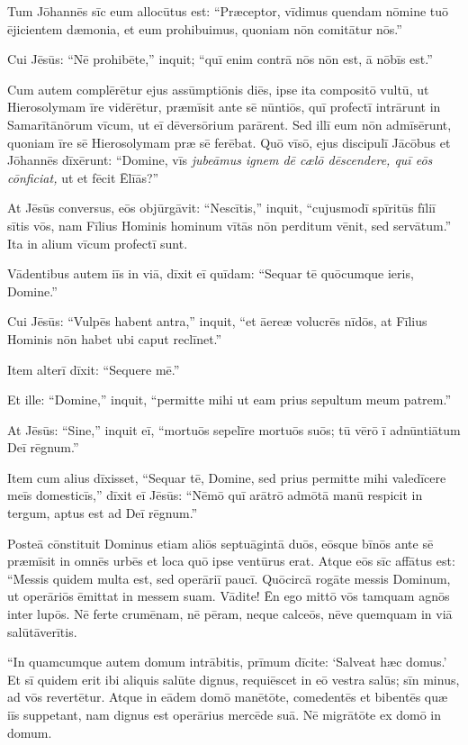\Versus Tum Jōhannēs sīc eum allocūtus est: ``Præceptor, vīdimus quendam nōmine tuō ējicientem dæmonia, et eum prohibuimus, quoniam nōn comitātur nōs.''

\Versus Cui Jēsūs: ``Nē prohibēte,'' inquit; ``quī enim contrā nōs nōn est, ā nōbīs est.''

\Versus Cum autem complērētur ejus assūmptiōnis diēs, ipse ita compositō vultū, ut Hierosolymam īre vidērētur,
\Versus præmīsit ante sē nūntiōs, quī profectī intrārunt in Samarītānōrum vīcum, ut eī dēversōrium parārent.
\Versus Sed illī eum nōn admīsērunt, quoniam īre sē Hierosolymam præ sē ferēbat.
\Versus Quō vīsō, ejus discipulī Jācōbus et Jōhannēs dīxērunt: ``Domine, vīs \emph{jubeāmus ignem dē cælō dēscendere, quī eōs cōnficiat,} ut et fēcit Ēlīās?''

\Versus At Jēsūs conversus, eōs objūrgāvit: ``Nescītis,'' inquit, ``cujusmodī spīritūs fīliī sītis vōs,
\Versus nam Fīlius Hominis hominum vītās nōn perditum vēnit, sed servātum.'' Ita in alium vīcum profectī sunt.

\Versus Vādentibus autem iīs in viā, dīxit eī quīdam: ``Sequar tē quōcumque ieris, Domine.''

\Versus Cui Jēsūs: ``Vulpēs habent antra,'' inquit, ``et āereæ volucrēs nīdōs, at Fīlius Hominis nōn habet ubi caput reclīnet.''

\Versus Item alterī dīxit: ``Sequere mē.''

Et ille: ``Domine,'' inquit, ``permitte mihi ut eam prius sepultum meum patrem.''

\Versus At Jēsūs: ``Sine,'' inquit eī, ``mortuōs sepelīre mortuōs suōs; tū vērō ī adnūntiātum Deī rēgnum.''

\Versus Item cum alius dīxisset, ``Sequar tē, Domine, sed prius permitte mihi valedīcere meīs domesticīs,''
\Versus dīxit eī Jēsūs: ``Nēmō quī arātrō admōtā manū respicit in tergum, aptus est ad Deī rēgnum.''


\Caput
\Versus Posteā cōnstituit Dominus etiam aliōs septuāgintā duōs, eōsque bīnōs ante sē præmīsit in omnēs urbēs et loca quō ipse ventūrus erat.
\Versus Atque eōs sīc affātus est: ``Messis quidem multa est, sed operāriī paucī. Quōcircā rogāte messis Dominum, ut operāriōs ēmittat in messem suam.
\Versus Vādite! Ēn ego mittō vōs tamquam agnōs inter lupōs.
\Versus Nē ferte crumēnam, nē pēram, neque calceōs, nēve quemquam in viā salūtāverītis.

\Versus ``In quamcumque autem domum intrābitis, prīmum dīcite: `Salveat hæc domus.'
\Versus Et sī quidem erit ibi aliquis salūte dignus, requiēscet in eō vestra salūs; sīn minus, ad vōs revertētur.
\Versus Atque in eādem domō manētōte, comedentēs et bibentēs quæ iīs suppetant, nam dignus est operārius mercēde suā. Nē migrātōte ex domō in domum.

